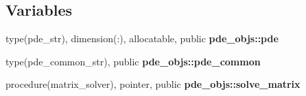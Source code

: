 \subsection*{Variables}
\begin{DoxyCompactItemize}
\item 
type(pde\+\_\+str), dimension(\+:), allocatable, public {\bf pde\+\_\+objs\+::pde}
\item 
type(pde\+\_\+common\+\_\+str), public {\bf pde\+\_\+objs\+::pde\+\_\+common}
\item 
procedure(matrix\+\_\+solver), pointer, public {\bf pde\+\_\+objs\+::solve\+\_\+matrix}
\end{DoxyCompactItemize}
